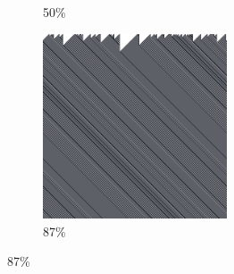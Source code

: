 \documentclass[12pt, fleqn]{report}                             %
\theoremstyle{break}                                            %
\begin{document}
\begin{figure}[ht!]
\begin{subfigure}[b]{0.4\linewidth}
          \caption{50\%}
        \end{subfigure}
        \begin{subfigure}[b]{0.4\linewidth}
          \includegraphics[width=0.6\textwidth]{Images/152/d.png}
          \caption{87\%}
        \end{subfigure}
      \end{figure}
\end{document}

